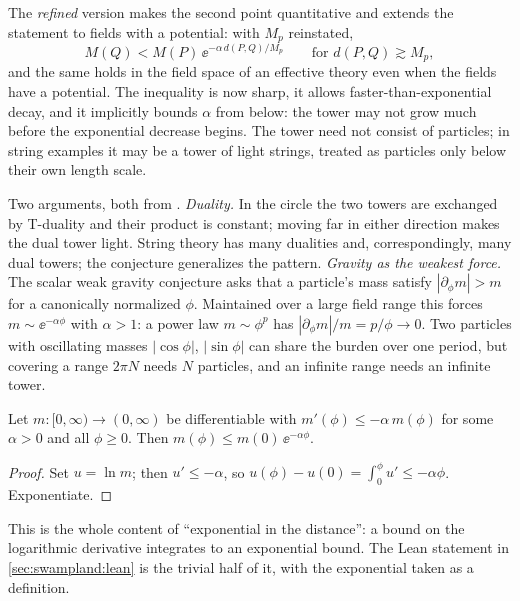 The \emph{refined} version  makes the second point quantitative and
extends the statement to fields with a potential: with $M_p$ reinstated,
\begin{equation}\label{eq:swampland:rsdc}
M(Q)<M(P)\,\ee^{-\alpha\,d(P,Q)/M_p}\qquad\text{for }d(P,Q)\gtrsim M_p,
\end{equation}
and the same holds in the field space of an effective theory even when the fields have a potential.
The inequality is now sharp, it allows faster-than-exponential decay, and it implicitly bounds
$\alpha$ from below: the tower may not grow much before the exponential decrease begins. The
tower need not consist of particles; in string examples it may be a tower of light strings,
treated as particles only below their own length scale.

\begin{physicsbox}
Two arguments, both from . \emph{Duality.} In the circle the
two towers are exchanged by T-duality and their product is constant; moving far in either
direction makes the dual tower light. String theory has many dualities and, correspondingly, many
dual towers; the conjecture generalizes the pattern. \emph{Gravity as the weakest force.} The
scalar weak gravity conjecture asks that a particle's mass satisfy $|\partial_\phi m|>m$ for a
canonically normalized $\phi$. Maintained over a large field range this forces $m\sim\ee^{-\alpha\phi}$
with $\alpha>1$: a power law $m\sim\phi^p$ has $|\partial_\phi m|/m=p/\phi\to0$. Two particles with
oscillating masses $|\cos\phi|$, $|\sin\phi|$ can share the burden over one period, but covering a
range $2\pi N$ needs $N$ particles, and an infinite range needs an infinite tower.
\end{physicsbox}

\begin{proposition}\label{prop:swampland:expbound}
Let $m:[0,\infty)\to(0,\infty)$ be differentiable with $m'(\phi)\le-\alpha\,m(\phi)$ for some
$\alpha>0$ and all $\phi\ge0$. Then $m(\phi)\le m(0)\,\ee^{-\alpha\phi}$.
\end{proposition}
\begin{proof}
Set $u=\ln m$; then $u'\le-\alpha$, so $u(\phi)-u(0)=\int_0^\phi u'\le-\alpha\phi$. Exponentiate.
\end{proof}
This is the whole content of ``exponential in the distance'': a bound on the logarithmic
derivative integrates to an exponential bound. The Lean statement
 in \cref{sec:swampland:lean} is the trivial half of it, with the
exponential taken as a definition.

